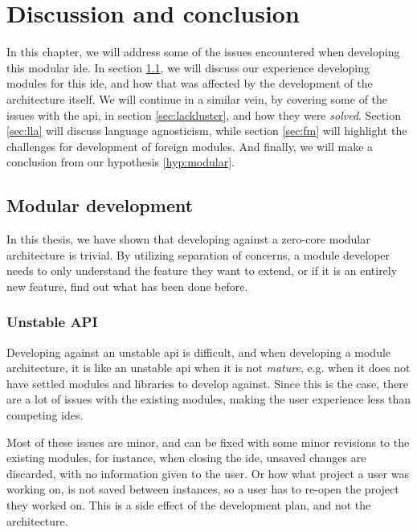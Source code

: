 \chapter{Discussion and conclusion} \label{cha:conclusion}

In this chapter, we will address some of the issues encountered when developing
this modular \gls*{ide}. In section \ref{sec:mod-dev}, we will discuss our
experience developing modules for this \gls*{ide}, and how that was affected by
the development of the architecture itself. We will continue in a similar vein,
by covering some of the issues with the \gls*{api}, in section
\ref{sec:lackluster}, and how they were \textit{solved}. Section \ref{sec:lla}
will discuss language agnosticism, while section \ref{sec:fm} will highlight the
challenges for development of foreign modules. And finally, we will make a
conclusion from our hypothesis \ref{hyp:modular}.


\section{Modular development} \label{sec:mod-dev}

In this thesis, we have shown that developing against a zero-core modular
architecture is trivial. By utilizing separation of concerns, a module developer
needs to only understand the feature they want to extend, or if it is an
entirely new feature, find out what has been done before.


\subsection{Unstable API}

Developing against an unstable \gls*{api} is difficult, and when developing a
module architecture, it is like an unstable \gls*{api} when it is not
\textit{mature}, e.g. when it does not have settled modules and libraries to
develop against. Since this is the case, there are a lot of issues with the
existing modules, making the user experience less than competing \gls*{ide}s.

Most of these issues are minor, and can be fixed with some minor revisions to
the existing modules, for instance, when closing the \gls*{ide}, unsaved changes
are discarded, with no information given to the user. Or how what project a user
was working on, is not saved between instances, so a user has to re-open the
project they worked on. This is a side effect of the development plan, and not
the architecture.

